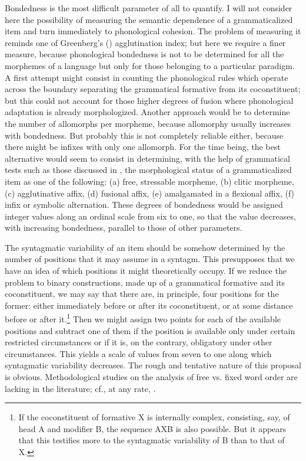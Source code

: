 Bondedness is the most difficult parameter of all to quantify. I will not consider here the possibility of measuring the semantic dependence of a grammaticalized item and turn immediately to phonological cohesion. The problem of measuring it reminds one of Greenberg's (\citeyear{Greenberg1954}) agglutination index; but here we require a finer measure, because phonological bondedness is not to be determined for all the morphemes of a language but only for those belonging to a particular paradigm. A first attempt might consist in counting the phonological rules which operate across the boundary separating the grammatical formative from its coconstituent; but this could not account for those higher degrees of fusion where phonological adaptation is already morphologized. Another approach would be to determine the number of allomorphs per morpheme, because allomorphy usually increases with bondedness. But probably this is not completely reliable either, because there might be infixes with only one allomorph. For the time being, the best alternative would seem to consist in determining, with the help of grammatical tests such as those discussed in , the morphological status of a grammaticalized item as one of the following: (a) free, stressable morpheme, (b) clitic morpheme, (c) agglutinative affix, (d) fusional affix, (e) amalgamated in a flexional affix, (f) infix or symbolic alternation. These degrees of bondedness would be assigned integer values along an ordinal scale from six to one, so that the value decreases, with increasing bondedness, parallel to those of other parameters.

The syntagmatic variability of an item should be somehow determined by the number of positions that it may assume in a syntagm. This presupposes that we have an idea of which positions it might theoretically occupy. If we reduce the problem to binary constructions, made up of a grammatical formative and its coconstituent, we may say that there are, in principle, four positions for the former: either immediately before or after its coconstituent, or at some distance before or after it.\footnote{If the coconstituent of formative X is internally complex, consisting, say, of head A and modifier B, the sequence AXB is also possible. But it appears that this testifies more to the syntagmatic variability of B than to that of X.} Then we might assign two points for each of the available positions and subtract one of them if the position is available only under certain restricted circumstances or if it is, on the contrary, obligatory under other circumstances. This yields a scale of values from seven to one along which syntagmatic variability decreases.%
 The rough and tentative nature of this proposal is obvious. Methodological studies on the analysis of free vs. fixed word order are lacking in the literature; cf., at any rate, \citet{Steele1978}.

